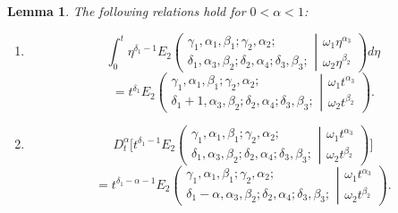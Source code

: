 \documentclass{amsart}
\numberwithin{equation}{section}
\newtheorem{lem}[thm]{Lemma}
\begin{document}
\begin{lem}
The following relations hold for $0<\alpha<1$:
\begin{enumerate}
    \item   \[
    \int_0^t \eta^{\delta_1-1 }E_2\left( \begin{array}{c}\gamma_1,\alpha_1, \beta_1 ; \gamma_2, \alpha_2 ; \\\delta_1, \alpha_3, \beta_2 ;\delta_2, \alpha_4; \delta_3, \beta_3 ; \end{array} \left| \begin{array}{c}\omega_1 \eta^{\alpha_3} \\\omega_2 \eta^{\beta_2} \end{array} \right.\right) d\eta
    \]
    \begin{equation} \label{jumaeva:eq:8}
    =t^{\delta_1} E_2\left( \begin{array}{c}\gamma_1,\alpha_1, \beta_1 ; \gamma_2, \alpha_2 ; \\\delta_1+1, \alpha_3, \beta_2 ;\delta_2, \alpha_4; \delta_3, \beta_3 ; \end{array} \left| \begin{array}{c}\omega_1 t^{\alpha_3} \\\omega_2 t^{\beta_2}\end{array}\right.\right).\end{equation}
    \item  
    \begin{equation*}
    D_t^\alpha\bigg[t^{\delta_1-1 }E_2\left(\begin{array}{c}\gamma_1,\alpha_1, \beta_1 ; \gamma_2, \alpha_2 ; \\\delta_1, \alpha_3, \beta_2 ;\delta_2, \alpha_4; \delta_3, \beta_3 ; \end{array} \left| \begin{array}{c}\omega_1 t^{\alpha_3} \\\omega_2 t^{\beta_2} \end{array} \right.\right)\bigg]
    \end{equation*}
    \begin{equation}\label{jumaeva:eq:9}
    =t^{\delta_1-\alpha-1} E_2\left( \begin{array}{c}\gamma_1,\alpha_1, \beta_1 ; \gamma_2, \alpha_2 ; \\\delta_1-\alpha, \alpha_3, \beta_2 ;\delta_2, \alpha_4; \delta_3, \beta_3 ; \end{array} \left|\begin{array}{c}\omega_1 t^{\alpha_3} \\\omega_2 t^{\beta_2} \end{array}\right.\right).

\end{equation}
\end{enumerate}
\end{lem}
\end{document}
